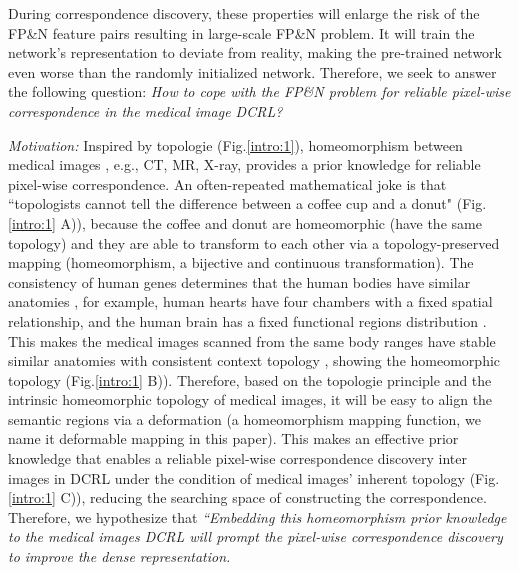 During correspondence discovery, these properties will enlarge the risk of the FP\&N feature pairs \cite{chuang2020debiased,chuang2022robust} resulting in large-scale FP\&N problem. It will train the network's representation to deviate from reality, making the pre-trained network even worse than the randomly initialized network. Therefore, we seek to answer the following question: \emph{How to cope with the FP\&N problem for reliable pixel-wise correspondence in the medical image DCRL?}

\emph{Motivation:} Inspired by topologie \cite{alexandroff2013topologie} (Fig.\ref{intro:1}), homeomorphism \cite{i1996new} between medical images \cite{heimann2009statistical,bazin2008homeomorphic,miller2001group}, e.g., CT, MR, X-ray, provides a prior knowledge for reliable pixel-wise correspondence. An often-repeated mathematical joke is that ``topologists cannot tell the difference between a coffee cup and a donut" \cite{hubbard1991differential} (Fig.\ref{intro:1} A)), because the coffee and donut are homeomorphic (have the same topology) and they are able to transform to each other via a topology-preserved mapping (homeomorphism, a bijective and continuous transformation). The consistency of human genes determines that the human bodies have similar anatomies \cite{netter2014atlas}, for example, human hearts have four chambers with a fixed spatial relationship, and the human brain has a fixed functional regions distribution \cite{bazin2008homeomorphic}. This makes the medical images scanned from the same body ranges have stable similar anatomies \cite{netter2014atlas} with consistent context topology \cite{He_2023_CVPR}, showing the homeomorphic topology (Fig.\ref{intro:1} B)). Therefore, based on the topologie principle and the intrinsic homeomorphic topology of medical images, it will be easy to align the semantic regions via a deformation (a homeomorphism mapping function, we name it deformable mapping in this paper). This makes an effective prior knowledge that enables a reliable pixel-wise correspondence discovery inter images in DCRL under the condition of medical images' inherent topology (Fig.\ref{intro:1} C)), reducing the searching space of constructing the correspondence. Therefore, we hypothesize that \emph{``Embedding this homeomorphism prior knowledge to the medical images DCRL will prompt the pixel-wise correspondence discovery to improve the dense representation.}

